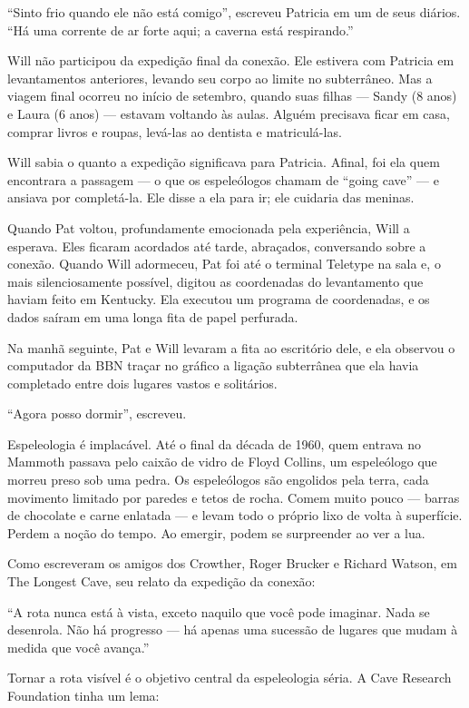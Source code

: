 \documentclass[12pt,a4paper]{article}
\begin{document}
“Sinto frio quando ele não está comigo”,
escreveu Patricia em um de seus diários.
“Há uma corrente de ar forte aqui; a caverna está respirando.”

Will não participou da expedição final da conexão.
Ele estivera com Patricia em levantamentos anteriores, levando seu corpo ao limite no subterrâneo.
Mas a viagem final ocorreu no início de setembro, quando suas filhas — Sandy (8 anos) e Laura (6 anos) — estavam voltando às aulas.
Alguém precisava ficar em casa, comprar livros e roupas, levá-las ao dentista e matriculá-las.

Will sabia o quanto a expedição significava para Patricia. Afinal, foi ela quem encontrara a passagem — o que os espeleólogos chamam de “going cave” — e ansiava por completá-la.
Ele disse a ela para ir; ele cuidaria das meninas.

Quando Pat voltou, profundamente emocionada pela experiência, Will a esperava.
Eles ficaram acordados até tarde, abraçados, conversando sobre a conexão.
Quando Will adormeceu, Pat foi até o terminal Teletype na sala e, o mais silenciosamente possível, digitou as coordenadas do levantamento que haviam feito em Kentucky.
Ela executou um programa de coordenadas, e os dados saíram em uma longa fita de papel perfurada.

Na manhã seguinte, Pat e Will levaram a fita ao escritório dele, e ela observou o computador da BBN traçar no gráfico a ligação subterrânea que ela havia completado entre dois lugares vastos e solitários.

“Agora posso dormir”, escreveu.

Espeleologia é implacável.
Até o final da década de 1960, quem entrava no Mammoth passava pelo caixão de vidro de Floyd Collins, um espeleólogo que morreu preso sob uma pedra.
Os espeleólogos são engolidos pela terra, cada movimento limitado por paredes e tetos de rocha.
Comem muito pouco — barras de chocolate e carne enlatada — e levam todo o próprio lixo de volta à superfície.
Perdem a noção do tempo.
Ao emergir, podem se surpreender ao ver a lua.

Como escreveram os amigos dos Crowther, Roger Brucker e Richard Watson, em The Longest Cave, seu relato da expedição da conexão:

“A rota nunca está à vista, exceto naquilo que você pode imaginar.
Nada se desenrola. Não há progresso — há apenas uma sucessão de lugares que mudam à medida que você avança.”

Tornar a rota visível é o objetivo central da espeleologia séria.
A Cave Research Foundation tinha um lema:
\end{document}
